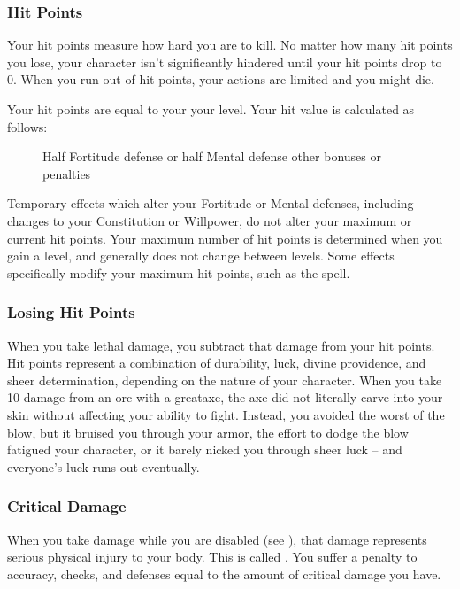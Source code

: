         \subsubsection{Hit Points}\label{Hit Points}
            Your hit points measure how hard you are to kill.
            No matter how many hit points you lose, your character isn't significantly hindered until your hit points drop to 0.
            When you run out of hit points, your actions are limited and you might die.

            Your hit points are equal to your  \x your level.
            Your hit value is calculated as follows:

            \begin{figure}[h]
                \centering Half Fortitude defense or half Mental defense \add other bonuses or penalties
            \end{figure}

             Temporary effects which alter your Fortitude or Mental defenses, including changes to your Constitution or Willpower, do not alter your maximum or current hit points.
            Your maximum number of hit points is determined when you gain a level, and generally does not change between levels.
            Some effects specifically modify your maximum hit points, such as the  spell.

        \subsubsection{Losing Hit Points}
            When you take lethal damage, you subtract that damage from your hit points.
             Hit points represent a combination of durability, luck, divine providence, and sheer determination, depending on the nature of your character.
            When you take 10 damage from an orc with a greataxe, the axe did not literally carve into your skin without affecting your ability to fight.
            Instead, you avoided the worst of the blow, but it bruised you through your armor, the effort to dodge the blow fatigued your character, or it barely nicked you through sheer luck -- and everyone's luck runs out eventually.

        \subsubsection{Critical Damage}\label{Critical Damage}
            When you take damage while you are disabled (see ), that damage represents serious physical injury to your body.
            This is called .
            You suffer a penalty to accuracy, checks, and defenses equal to the amount of critical damage you have.

